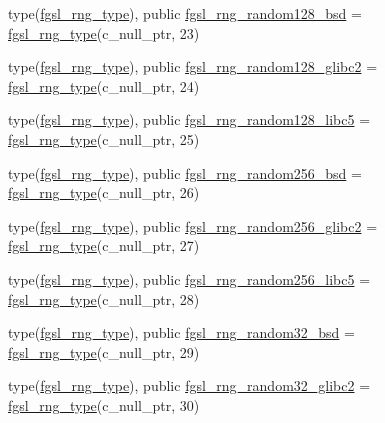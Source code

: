 \begin{DoxyCompactItemize}
\item 
type(\hyperlink{structfgsl_1_1fgsl__rng__type}{fgsl\-\_\-rng\-\_\-type}), public \hyperlink{classfgsl_a398996158c507375c9f2d554deb5d27b}{fgsl\-\_\-rng\-\_\-random128\-\_\-bsd} = \hyperlink{structfgsl_1_1fgsl__rng__type}{fgsl\-\_\-rng\-\_\-type}(c\-\_\-null\-\_\-ptr, 23)
\item 
type(\hyperlink{structfgsl_1_1fgsl__rng__type}{fgsl\-\_\-rng\-\_\-type}), public \hyperlink{classfgsl_aa3d875270ff8191378a356c1b7aadc43}{fgsl\-\_\-rng\-\_\-random128\-\_\-glibc2} = \hyperlink{structfgsl_1_1fgsl__rng__type}{fgsl\-\_\-rng\-\_\-type}(c\-\_\-null\-\_\-ptr, 24)
\item 
type(\hyperlink{structfgsl_1_1fgsl__rng__type}{fgsl\-\_\-rng\-\_\-type}), public \hyperlink{classfgsl_a49f71c990dc8dddacbdcdc1a012c4654}{fgsl\-\_\-rng\-\_\-random128\-\_\-libc5} = \hyperlink{structfgsl_1_1fgsl__rng__type}{fgsl\-\_\-rng\-\_\-type}(c\-\_\-null\-\_\-ptr, 25)
\item 
type(\hyperlink{structfgsl_1_1fgsl__rng__type}{fgsl\-\_\-rng\-\_\-type}), public \hyperlink{classfgsl_aa0a98fef28a7dc6e538ab97f5f07fc22}{fgsl\-\_\-rng\-\_\-random256\-\_\-bsd} = \hyperlink{structfgsl_1_1fgsl__rng__type}{fgsl\-\_\-rng\-\_\-type}(c\-\_\-null\-\_\-ptr, 26)
\item 
type(\hyperlink{structfgsl_1_1fgsl__rng__type}{fgsl\-\_\-rng\-\_\-type}), public \hyperlink{classfgsl_aca7a71613cf5e355ebfe501bd30a0062}{fgsl\-\_\-rng\-\_\-random256\-\_\-glibc2} = \hyperlink{structfgsl_1_1fgsl__rng__type}{fgsl\-\_\-rng\-\_\-type}(c\-\_\-null\-\_\-ptr, 27)
\item 
type(\hyperlink{structfgsl_1_1fgsl__rng__type}{fgsl\-\_\-rng\-\_\-type}), public \hyperlink{classfgsl_a07865f4f3a0cd07f3e922da1b3616e68}{fgsl\-\_\-rng\-\_\-random256\-\_\-libc5} = \hyperlink{structfgsl_1_1fgsl__rng__type}{fgsl\-\_\-rng\-\_\-type}(c\-\_\-null\-\_\-ptr, 28)
\item 
type(\hyperlink{structfgsl_1_1fgsl__rng__type}{fgsl\-\_\-rng\-\_\-type}), public \hyperlink{classfgsl_a1adf276b8f59b011e5a28451b9245a96}{fgsl\-\_\-rng\-\_\-random32\-\_\-bsd} = \hyperlink{structfgsl_1_1fgsl__rng__type}{fgsl\-\_\-rng\-\_\-type}(c\-\_\-null\-\_\-ptr, 29)
\item 
type(\hyperlink{structfgsl_1_1fgsl__rng__type}{fgsl\-\_\-rng\-\_\-type}), public \hyperlink{classfgsl_a26cb9ca6b94f3b1db24cdc006f07196a}{fgsl\-\_\-rng\-\_\-random32\-\_\-glibc2} = \hyperlink{structfgsl_1_1fgsl__rng__type}{fgsl\-\_\-rng\-\_\-type}(c\-\_\-null\-\_\-ptr, 30)
\item 

\end{DoxyCompactItemize}
